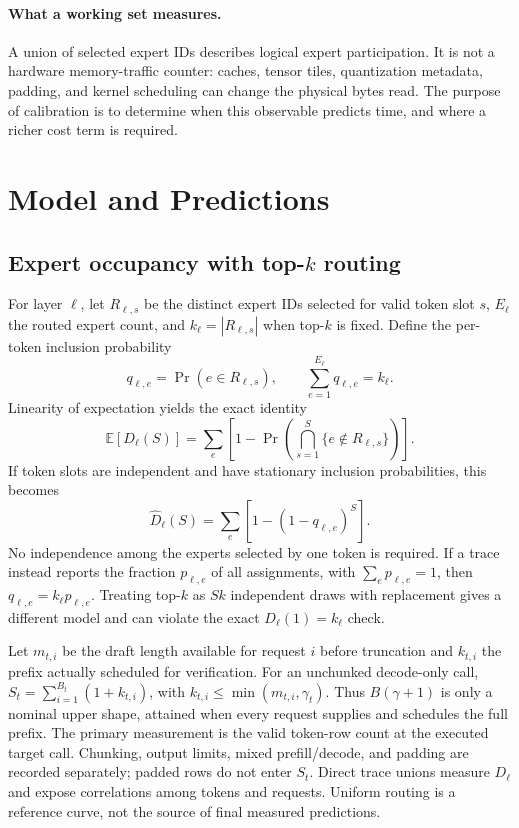 \documentclass[10pt,twocolumn]{article}
\begin{document}
\paragraph{What a working set measures.} A union of selected expert IDs describes logical expert participation. It is not a hardware memory-traffic counter: caches, tensor tiles, quantization metadata, padding, and kernel scheduling can change the physical bytes read. The purpose of calibration is to determine when this observable predicts time, and where a richer cost term is required.

\section{Model and Predictions}
\subsection{Expert occupancy with top-\texorpdfstring{$k$}{k} routing}
For layer $\ell$, let $R_{\ell,s}$ be the distinct expert IDs selected for valid token slot $s$, $E_\ell$ the routed expert count, and $k_\ell=|R_{\ell,s}|$ when top-$k$ is fixed. Define the per-token inclusion probability
\begin{equation}
q_{\ell,e}=\Pr(e\in R_{\ell,s}),\qquad
\sum_{e=1}^{E_\ell}q_{\ell,e}=k_\ell.
\end{equation}
Linearity of expectation yields the exact identity
\begin{equation}
\mathbb E[D_\ell(S)] = \sum_e\left[1-\Pr\!\left(\bigcap_{s=1}^{S}\{e\notin R_{\ell,s}\}\right)\right].
\end{equation}
If token slots are independent and have stationary inclusion probabilities, this becomes
\begin{equation}\label{eq:d}
\widehat D_\ell(S)=\sum_e[1-(1-q_{\ell,e})^S].
\end{equation}
No independence among the experts selected by one token is required. If a trace instead reports the fraction $p_{\ell,e}$ of all assignments, with $\sum_e p_{\ell,e}=1$, then $q_{\ell,e}=k_\ell p_{\ell,e}$. Treating top-$k$ as $Sk$ independent draws with replacement gives a different model and can violate the exact $D_\ell(1)=k_\ell$ check.

Let $m_{t,i}$ be the draft length available for request $i$ before truncation and $k_{t,i}$ the prefix actually scheduled for verification. For an unchunked decode-only call, $S_t=\sum_{i=1}^{B_t}(1+k_{t,i})$, with $k_{t,i}\leq\min(m_{t,i},\gamma_t)$. Thus $B(\gamma+1)$ is only a nominal upper shape, attained when every request supplies and schedules the full prefix. The primary measurement is the valid token-row count at the executed target call. Chunking, output limits, mixed prefill/decode, and padding are recorded separately; padded rows do not enter $S_t$. Direct trace unions measure $D_\ell$ and expose correlations among tokens and requests. Uniform routing is a reference curve, not the source of final measured predictions.
\end{document}

